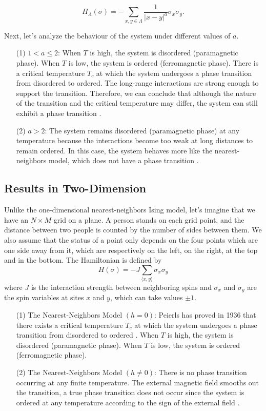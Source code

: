 \documentclass[11pt]{book}
\begin{document}
$$
H_{\Lambda}(\sigma) = - \sum_{x,y \in \Lambda}\frac{1}{\left| x - y \right|^a}\sigma_x \sigma_y.
$$

Next, let's analyze the behaviour of the system under different values of $a$.
\begin{enumerate}
\item[(1)] $1 < a \leq 2$: When $T$ is high, the system is disordered (paramagnetic phase). When $T$ is low, the system is ordered (ferromagnetic phase). There is a critical temperature  $T_c$  at which the system undergoes a phase transition from disordered to ordered. The long-range interactions are strong enough to support the transition. Therefore, we can conclude that although the nature of the transition and the critical temperature may differ, the system can still exhibit a phase transition \cite{dys} \cite{frsp}.
\item[(2)] $a > 2$: The system remains disordered (paramagnetic phase) at any temperature because the interactions become too weak at long distances to remain ordered. In this case, the system behaves more like the nearest-neighbors model, which does not have a phase transition \cite{HOG}. 
\end{enumerate}

\subsection{Results in Two-Dimension}

Unlike the one-dimensional nearest-neighbors Ising model, let's imagine that we have an $N \times M$ grid on a plane. A person stands on each grid point, and the distance between two people is counted by the number of sides between them. We also assume that the status of a point only depends on the four points which are one side away from it, which are respectively on the left, on the right, at the top and in the bottom. The Hamiltonian is defined by 
$$
H(\sigma) = -J\sum_{\langle x,y \rangle}\sigma_x \sigma_y
$$
where $J$ is the interaction strength between neighboring spins and $\sigma_x$ and $\sigma_y$ are the spin variables at sites $x$ and $y$, which can take values $\pm 1$.

\begin{enumerate}
\item[(1)]The Nearest-Neighbors Model $(h = 0)$:
Peierls has proved in 1936 that there exists a critical temperature $T_c$ at which the system undergoes a phase transition from disordered to ordered \cite{Peierls}. When $T$ is high, the system is disordered (paramagnetic phase). When $T$ is low, the system is ordered (ferromagnetic phase).
\item[(2)]The Nearest-Neighbors Model $(h \neq 0)$:
There is no phase transition occurring at any finite temperature. The external magnetic field smooths out the transition, a true phase transition does not occur since the system is ordered at any temperature according to the sign of the external field \cite{LY}.
\end{enumerate}
\end{document}
